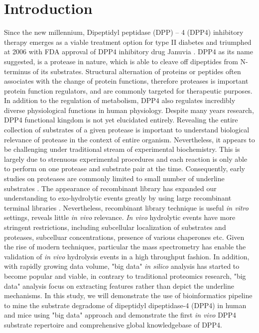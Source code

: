 \section{Introduction}
\label{sec:intro}

Since the new millennium, Dipeptidyl peptidase (DPP) – 4 (DPP4) inhibitory therapy emerges as a viable treatment option for type II diabetes and triumphed at 2006 with FDA approval of DPP4 inhibitory drug Januvia \cite{RN822}.  DPP4 as its name suggested, is a protease in nature, which is able to cleave off dipeptides from N-terminus of its substrates. Structural alternation of proteins or peptides often associates with the change of protein functions, therefore proteases is important protein function regulators, and are commonly targeted for therapeutic purposes. 
\\
In addition to the regulation of metabolism, DPP4 also regulates incredibly diverse physiological functions in human physiology. Despite many years research, DPP4 functional kingdom is not yet elucidated entirely. Revealing the entire collection of substrates of a given protease is important to understand biological relevance of protease in the context of entire organism. Nevertheless, it appears to be challenging under traditional stream of experimental biochemistry. This is largely due to strenuous experimental procedures and each reaction is only able to perform on one protease and substrate pair at the time. Consequently, early studies on proteases are commonly limited to small number of underline substrates \cite{:1992aa}. The appearance of recombinant library has expanded our understanding to exo-hydrolytic events greatly by using large recombinant terminal libraries \cite{Gupta:2010aa}. Nevertheless, recombinant library technique is useful \textit{in vitro} settings, reveals little \textit{in vivo} relevance. \textit{In vivo} hydrolytic events have more stringent restrictions, including subcellular localization of substrates and proteases, subcelluar concentrations, presence of various chaperones etc. Given the rise of modern techniques, particular the mass spectrometry has enable the validation of \textit{in vivo} hydrolysis events in a high throughput fashion. In addition, with rapidly growing data volume, "big data" \textit{in silico} analysis has started to become popular and viable, in contrary to traditional proteomics research, "big data" analysis focus on extracting features rather than depict the underline mechanisms. In this study, we will demonstrate the use of bioinformatics pipeline to mine the substrate degradome of dipeptidyl dipeptidase-4 (DPP4) in human and mice using "big data" approach and demonstrate the first \textit{in vivo}  DPP4 substrate repertoire and comprehensive global knowledgebase of DPP4.
